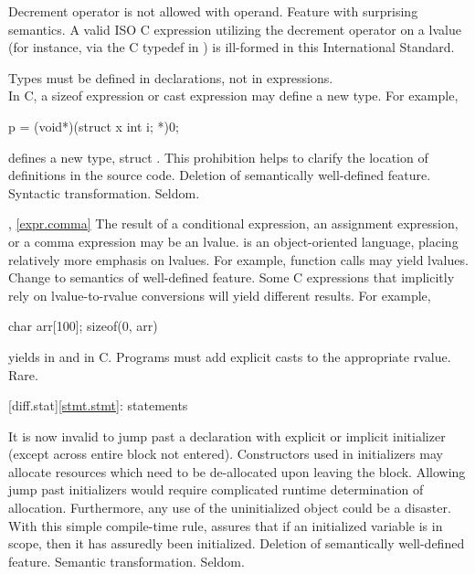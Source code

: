 \change
Decrement operator is not allowed with  operand.
\rationale Feature with surprising semantics.
\effect A valid ISO C expression utilizing the decrement operator on
a  lvalue (for instance, via the C typedef in )
is ill-formed in this International Standard.

\change Types must be defined in declarations, not in expressions.\\
In C, a sizeof expression or cast expression may define a new type.
For example,
\begin{codeblock}
p = (void*)(struct x {int i;} *)0;
\end{codeblock}
defines a new type, struct .
\rationale
This prohibition helps to clarify the location of
definitions in the source code.
\effect
Deletion of semantically well-defined feature.
\difficulty
Syntactic transformation.
\howwide
Seldom.

, \ref{expr.comma}
%
%
%
\change The result of a conditional expression, an assignment expression, or a comma expression may be an lvalue.
\rationale
\Java{} is an object-oriented language, placing relatively
more emphasis on lvalues.  For example, function calls may
yield lvalues.
\effect
Change to semantics of well-defined feature.  Some C
expressions that implicitly rely on lvalue-to-rvalue
conversions will yield different results.  For example,

\begin{codeblock}
char arr[100];
sizeof(0, arr)
\end{codeblock}

yields
in \Java{} and
in C.
\difficulty
Programs must add explicit casts to the appropriate rvalue.
\howwide
Rare.

[diff.stat]{\ref{stmt.stmt}: statements}

\change It is now invalid to jump past a declaration with explicit or implicit initializer (except across entire block not entered).
\rationale
Constructors used in initializers may allocate
resources which need to be de-allocated upon leaving the
block.
Allowing jump past initializers would require
complicated runtime determination of allocation.
Furthermore, any use of the uninitialized object could be a
disaster.
With this simple compile-time rule, \Java{} assures that
if an initialized variable is in scope, then it has assuredly been
initialized.
\effect
Deletion of semantically well-defined feature.
\difficulty
Semantic transformation.
\howwide
Seldom.

